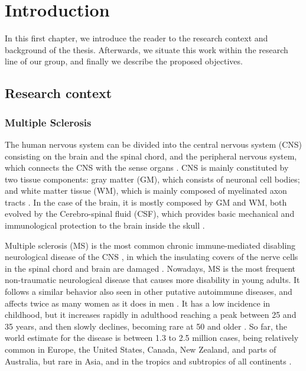 \chapter{Introduction}


In this first chapter, we introduce the reader to the research context and background of the thesis. Afterwards, we situate this work within the research line of our group, and finally we describe the proposed objectives. 

\section{Research context}
\label{sec:introduction_research_context}

\subsection{Multiple Sclerosis}
\label{sub:introduction_multiple_sclerosis}

The human nervous system can be divided into the central nervous system (CNS) consisting on the brain and the spinal chord, and the peripheral nervous system, which connects the CNS with the sense organs \cite{Brodal2010}. CNS is mainly constituted by two tissue components: gray matter (GM), which consists of neuronal cell bodies; and white matter tissue (WM), which is mainly composed of myelinated axon tracts \cite{Sperber2006}. In the case of the brain,  it is mostly composed by GM and WM, both evolved by the Cerebro-spinal fluid (CSF), which provides basic mechanical and immunological protection to the brain inside the skull \cite{Sperber2006}. 

Multiple sclerosis (MS) is the most common chronic immune-mediated disabling neurological disease of the CNS \cite{Steinman1996}, in which the insulating covers of the nerve cells in the spinal chord and brain are damaged \cite{Compston2008}. Nowadays, MS is the most frequent non-traumatic neurological disease that causes more disability in young adults. It follows a similar behavior also seen in other putative autoimmune diseases, and affects twice as many women as it does in men \cite{Confavreux1980}. It has a low incidence in childhood, but it increases rapidly in adulthood reaching a peak between 25 and 35 years, and then slowly declines, becoming rare at 50 and older \cite{Cabezas2011}. So far, the world estimate for the disease is between 1.3 to 2.5 million cases, being relatively common in Europe, the United States, Canada, New Zealand, and parts of Australia, but rare in Asia, and in the tropics and subtropics of all continents \cite{Cabezas2011}. 

